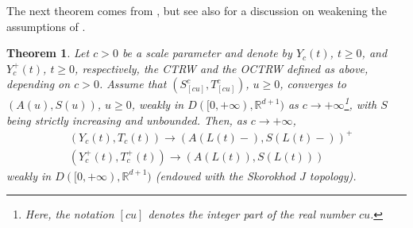 \documentclass[reqno]{amsart}
\newtheorem{theorem}{Theorem}[section] %
\theoremstyle{remark}
\numberwithin{equation}{section} %
\newcommand{\1}{\mathds{1}}
\begin{document}
	The next theorem comes from \cite[Theorem 3.6]{straka2011lagging}, but see also \cite[Section 2]{Meerschaert2014} for a discussion on weakening the assumptions of \cite{straka2011lagging}.
	\begin{theorem}
		\label{maintheoremctrwlim}
		Let $c>0$ be a scale parameter and denote by $Y_c(t)$, $t \geq 0$, and $Y_c^+(t)$, $t \geq 0$, respectively, the CTRW and the OCTRW defined as above, depending on $c>0$. Assume that $(S^c_{[cu]},T^c_{[cu]})$, $u\ge0$, converges to $(A(u), S(u))$, $u\ge0$, weakly in $D([0, +\infty), \mathbb{R}^{d+1})$ {as $c\to +\infty$}\footnote{Here, the notation $[cu]$ denotes the integer part of the real number $cu$.}, with $S$ being strictly increasing and unbounded. Then, as $c \to +\infty$,
		\begin{align}
			&( Y_c(t), T_c(t) ) \to (A(L(t)-), S(L(t)-))^+\\
			& ( Y_c^+(t), T_c^+(t) ) \to (A(L(t)), S(L(t)))
		\end{align}
		weakly in $D([0, +\infty), \mathbb{R}^{d+1})$ (endowed with the Skorokhod $J$ topology).
	\end{theorem}
\end{document}
